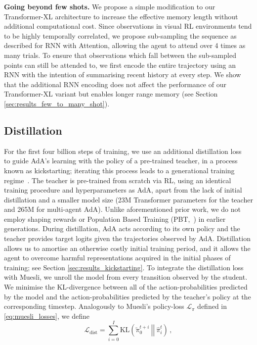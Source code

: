 \documentclass[11pt, a4paper, logo, copyright]{deepmind}
\begin{document}
\textbf{Going beyond few shots.} We propose a simple modification to our Transformer-XL architecture to increase the effective memory length without additional computational cost. Since observations in visual RL environments tend to be highly temporally correlated, we propose sub-sampling the sequence as described for RNN with Attention, allowing the agent to attend over 4 times as many trials. To ensure that observations which fall between the sub-sampled points can still be attended to, we first encode the entire trajectory using an RNN with the intention of summarising recent history at every step. We show that the additional RNN encoding does not affect the performance of our Transformer-XL variant but enables longer range memory (see Section \ref{sec:results_few_to_many_shot}).
\subsection{Distillation} \label{sec:methods_distillation}
For the first four billion steps of training, we use an additional distillation loss~\citep{Schmidhuber1992distillation, schmitt2018kickstarting, czarnecki2019distilling} to guide AdA's learning with the policy of a pre-trained teacher, in a process known as kickstarting; iterating this process leads to a generational training regime~\citep{xland,wang2102alchemy}. The teacher is pre-trained from scratch via RL, using an identical training procedure and hyperparameters as AdA, apart from the lack of initial distillation and a smaller model size (23M Transformer parameters for the teacher and 265M for multi-agent AdA). Unlike aforementioned prior work, we do not employ shaping rewards or Population Based Training (PBT,~\citet{jaderberg2017population}) in earlier generations. During distillation, AdA acts according to its own policy and the teacher provides target logits given the trajectories observed by AdA. Distillation allows us to amortise an otherwise costly initial training period, and it allows the agent to overcome harmful representations acquired in the initial phases of training; see Section \ref{sec:results_kickstarting}.
To integrate the distillation loss with Muesli, we unroll the model from every transition observed by the student. We minimise the KL-divergence between all of the action-probabilities predicted by the model and the action-probabilities predicted by the teacher's policy at the corresponding timestep. Analogously to Muesli's policy-loss $\mathcal{L}_\pi$ defined in \eqref{eq:muesli_losses}, we define
\begin{equation}
\mathcal{L}_{\textrm{dist}}=\sum_{i=0}^I \textrm{KL}\left(\left. \left.\tilde{\pi}^{t+i}_0 \ \right|\right|\ \hat{\pi}^t_i \right)\, ,
\end{equation}
\end{document}
